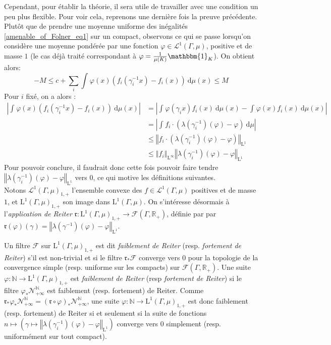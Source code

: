 \documentclass[a4paper,12pt]{article}
\newcommand{\R}{\mathbb{R}}
\newcommand{\N}{\mathbb{N}}
\newcommand{\norm}[1]{\left\Vert #1\right\Vert}
\newcommand{\abs}[1]{\left\vert#1\right\vert}
\newcommand{\indic}{\mathbbm{1}}
\newcommand{\integral}[4]{\int_{#1}^{#2} #3~\mathrm{d}#4}
\newcommand{\ssi}{si et seulement si }
\newcommand{\inv}{^{-1}}
\newcommand{\comp}{\circ}
\newcommand{\nhds}{\mathcal{N}}
\begin{document}
Cependant, pour établir la théorie, il sera utile de travailler avec une condition un peu plus flexible. Pour voir cela, reprenons une dernière fois la preuve
précédente. Plutôt que de prendre une moyenne uniforme des inégalités \ref{amenable_of_Folner_eq1} sur un compact, observons ce qui se passe 
lorsqu'on considère une moyenne pondérée par une fonction $\varphi\in\mathscr{L}^1(\Gamma, \mu)$, positive et de masse $1$ (le cas déjà traité correspondant à $\varphi=\frac1{\mu(K)}\indic_K$).
On obtient alors:
\begin{equation*}\label{intuition_Reiter_eq1}
    -M \le c + \sum_i \integral{}{}{\varphi(x)\left(f_i(\gamma_i\inv x) - f_i(x)\right)}{\mu(x)} \le M
\end{equation*}
Pour $i$ fixé, on a alors :
\begin{align*}
    \abs{\integral{}{}{\varphi(x)(f_i(\gamma_i\inv x) - f_i(x))}{\mu(x)}} 
        &= \abs{\integral{}{}{\varphi(\gamma_i x)f_i(x)}{\mu(x)} - \integral{}{}{\varphi(x) f_i(x)}{\mu(x)}} \\
        &= \abs{\integral{}{}{f_i\cdot\left(\lambda(\gamma_i\inv)(\varphi)-\varphi\right)}{\mu}} \\
        &\le \norm{f_i\cdot\left(\lambda(\gamma_i\inv)(\varphi)-\varphi\right)}_{\mathrm{L}^1} \\
        &\le \norm{f_i}_{\mathrm{L}^\infty} \norm{\lambda(\gamma_i\inv)(\varphi)-\varphi}_{\mathrm{L}^1}
\end{align*}
Pour pouvoir conclure, il faudrait donc cette fois pouvoir faire tendre $\norm{\lambda(\gamma_i\inv)(\varphi)-\varphi}_{\mathrm{L}^1}$ vers $0$, ce qui motive les définitions suivantes.\\

Notons $\mathscr{L}^1(\Gamma, \mu)_{1,+}$ l'ensemble convexe des $f\in\mathscr{L}^1(\Gamma, \mu)$ positives et de masse $1$, et $\mathrm{L}^1(\Gamma, \mu)_{1, +}$ son image dans 
$\mathrm{L}^1(\Gamma, \mu)$. On s'intéresse désormais à l'\emph{application de Reiter} $\mathfrak{r} : \mathrm{L}^1(\Gamma, \mu)_{1, +}\to\mathcal{F}(\Gamma, \R_+)$, définie par
par $\mathfrak{r}(\varphi)(\gamma) = \norm{\lambda(\gamma\inv)(\varphi)-\varphi}_{\mathrm{L}^1}$.

Un filtre $\mathscr{F}$ sur $\mathrm{L}^1(\Gamma, \mu)_{1, +}$ est dit \emph{faiblement de Reiter} (resp. \emph{fortement de Reiter}) s'il est non-trivial et si le filtre $\mathfrak{r}_*\mathscr{F}$ converge vers $0$ pour la 
topologie de la convergence simple (resp. uniforme sur les compacts) sur $\mathcal{F}(\Gamma, \R_+)$. 
Une suite $\varphi:\N\to\mathrm{L}^1(\Gamma, \mu)_{1, +}$ est \emph{faiblement de Reiter} (resp \emph{fortement de Reiter}) si le filtre $\varphi_*\nhds_{+\infty}^\N$ est faiblement (resp. fortement) de Reiter. Comme $\mathfrak{r}_*\varphi_*\nhds_{+\infty}^\N = (\mathfrak{r}\comp \varphi)_*\nhds_{+\infty}^\N$,
une suite $\varphi:\N\to\mathrm{L}^1(\Gamma, \mu)_{1, +}$ est donc faiblement (resp. fortement) de Reiter \ssi la suite de fonctions
$n\mapsto\left(\gamma\mapsto\norm{\lambda(\gamma_i\inv)(\varphi)-\varphi}_{\mathrm{L}^1}\right)$ converge vers $0$ simplement 
(resp. uniformément sur tout compact).
\end{document}
